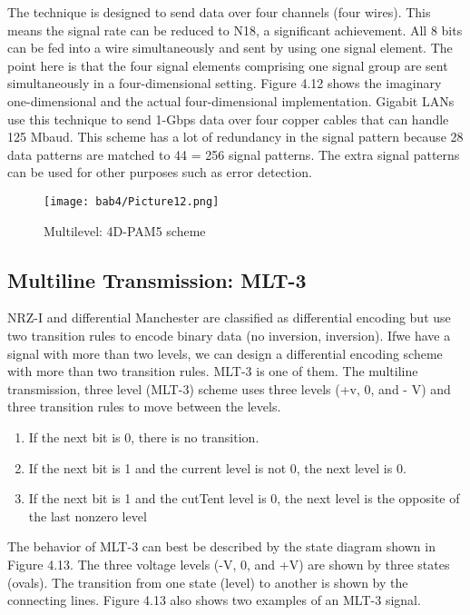The technique is designed to send data over four channels (four wires). This means the signal rate can be reduced to N18, a significant achievement. All 8 bits can be fed into a wire simultaneously and sent by using one signal element. The point here is that the four signal elements comprising one signal group are sent simultaneously in a four-dimensional setting. Figure 4.12 shows the imaginary one-dimensional and the actual four-dimensional implementation. Gigabit LANs use this technique to send 1-Gbps data over four copper cables that can handle 125 Mbaud. This scheme has a lot of redundancy in the signal pattern because 28 data patterns are matched to 44 = 256 signal patterns. The extra signal patterns can be used for other purposes such as error detection.

\begin{figure}
  \centering
  \texttt{[image: bab4/Picture12.png]}
  \caption{Multilevel: 4D-PAM5 scheme}
  \label{fig4:12}
\end{figure}

\subsection*{Multiline Transmission: MLT-3}
NRZ-I and differential Manchester are classified as differential encoding but use two transition rules to encode binary data (no inversion, inversion). Ifwe have a signal with more than two levels, we can design a differential encoding scheme with more than two transition rules. MLT-3 is one of them. The multiline transmission, three level (MLT-3) scheme uses three levels (+v, 0, and - V) and three transition rules to move between the levels.
\begin{enumerate}
  \item If the next bit is 0, there is no transition.
  \item If the next bit is 1 and the current level is not 0, the next level is 0.
  \item If the next bit is 1 and the cutTent level is 0, the next level is the opposite of the last nonzero level
\end{enumerate}

The behavior of MLT-3 can best be described by the state diagram shown in Figure 4.13. The three voltage levels (-V, 0, and +V) are shown by three states (ovals). The transition from one state (level) to another is shown by the connecting lines. Figure 4.13 also shows two examples of an MLT-3 signal.

